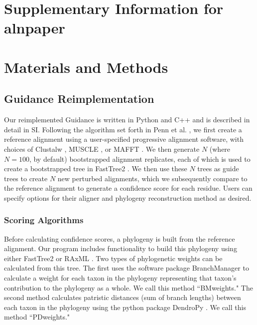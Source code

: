 \documentclass[11pt]{article}
\begin{document}
  

\section*{Supplementary Information for alnpaper}


\section*{Materials and Methods}

\subsection*{Guidance Reimplementation}
Our reimplemented Guidance is written in Python and C++ and is described in detail in SI. Following the algorithm set forth in Penn et al. \citep{Penn2010}, we first create a reference alignment using a user-specified progressive alignment software, with choices of Clustalw \citep{Thompson1994}, MUSCLE \citep{Edgar2004}, or MAFFT \citep{Katoh2002, Katoh2005}. We then generate $N$ (where $N=100$, by default) bootstrapped alignment replicates, each of which is used to create a bootstrapped tree in FastTree2 \citep{Price2010}. We then use these $N$ trees as guide trees to create $N$ new perturbed alignments, which we subsequently compare to the reference alignment to generate a confidence score for each residue. Users can specify options for their aligner and phylogeny reconstruction method as desired.

\subsubsection*{Scoring Algorithms}
Before calculating confidence scores, a phylogeny is built from the reference alignment. Our program includes functionality to build this phylogeny using either FastTree2 \citep{Price2010} or RAxML \citep{Stamatakis2006}. Two types of phylogenetic weights can be calculated from this tree. The first uses the software package BranchManager \citep{Stone2007} to calculate a weight for each taxon in the phylogeny representing that taxon's contribution to the phylogeny as a whole. We call this method ``BMweights." The second method calculates patristic distances (sum of branch lengths) between each taxon in the phylogeny using the python package DendroPy \citep{Sukumaran2010}. We call this method ``PDweights."
\end{document}

